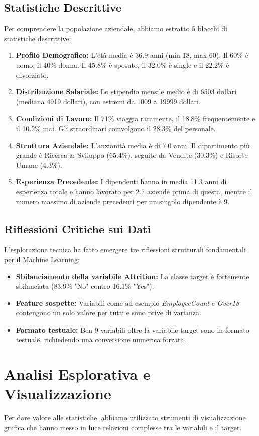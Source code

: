 \documentclass[11pt, a4paper]{article}
\begin{document}
\subsection{Statistiche Descrittive}
Per comprendere la popolazione aziendale, abbiamo estratto 5 blocchi di statistiche descrittive:
\begin{enumerate}
    \item \textbf{Profilo Demografico:} L'età media è 36.9 anni (min 18, max 60). Il 60\% è uomo, il 40\% donna. Il 45.8\% è sposato, il 32.0\% è single e il 22.2\% è divorziato.
    \item \textbf{Distribuzione Salariale:} Lo stipendio mensile medio è di 6503 dollari (mediana 4919 dollari), con estremi da 1009 a 19999 dollari.
    \item \textbf{Condizioni di Lavoro:} Il 71\% viaggia raramente, il 18.8\% frequentemente e il 10.2\% mai. Gli straordinari coinvolgono il 28.3\% del personale.
    \item \textbf{Struttura Aziendale:} L'anzianità media è di 7.0 anni. Il dipartimento più grande è Ricerca \& Sviluppo (65.4\%), seguito da Vendite (30.3\%) e Risorse Umane (4.3\%).
    \item \textbf{Esperienza Precedente:} I dipendenti hanno in media 11.3 anni di esperienza totale e hanno lavorato per 2.7 aziende prima di questa, mentre il numero massimo di aziende precedenti per un singolo dipendente è 9.
\end{enumerate}

\subsection{Riflessioni Critiche sui Dati}
L'esplorazione tecnica ha fatto emergere tre riflessioni strutturali fondamentali per il Machine Learning:
\begin{itemize}
    \item \textbf{Sbilanciamento della variabile Attrition:} La classe target è fortemente sbilanciata (83.9\% "No" contro 16.1\% "Yes").
    \item \textbf{Feature sospette:} Variabili come ad esempio \textit{EmployeeCount} e \textit{Over18} contengono un solo valore per tutti e sono prive di varianza.
    \item \textbf{Formato testuale:} Ben 9 variabili oltre la variabile target sono in formato testuale, richiedendo una conversione numerica forzata.
\end{itemize}

\section{Analisi Esplorativa e Visualizzazione}
Per dare valore alle statistiche, abbiamo utilizzato strumenti di visualizzazione grafica che hanno messo in luce relazioni complesse tra le variabili e il target. 
\end{document}

